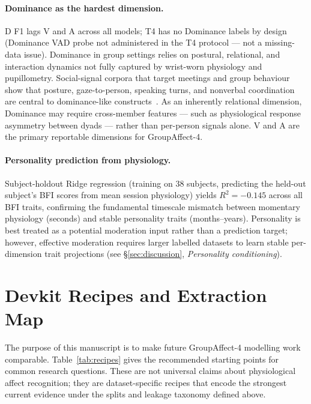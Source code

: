 \documentclass[sigconf,nonacm]{acmart}
\begin{document}
\paragraph{Dominance as the hardest dimension.}
D F1 lags V and A across all models; T4 has no Dominance labels by design
(Dominance VAD probe not administered in the T4 protocol --- not a missing-data
issue).
Dominance in group settings relies on postural, relational, and interaction
dynamics not fully captured by wrist-worn physiology and pupillometry.
Social-signal corpora that target meetings and group behaviour show that
posture, gaze-to-person, speaking turns, and nonverbal coordination are
central to dominance-like constructs~\cite{sanchez2012emergent,mccowan2005ami,
alameda2015salsa}.
As an inherently relational dimension, Dominance may
require cross-member features --- such as physiological response asymmetry
between dyads --- rather than per-person signals alone.
V and A are the primary reportable dimensions for GroupAffect-4.

\paragraph{Personality prediction from physiology.}
Subject-holdout Ridge regression (training on 38 subjects, predicting
the held-out subject's BFI scores from mean session physiology) yields
$R^2 = -0.145$ across all BFI traits, confirming the fundamental timescale
mismatch between momentary physiology (seconds) and stable personality
traits (months--years).
Personality is best treated as a potential moderation input rather than
a prediction target; however, effective moderation requires larger labelled
datasets to learn stable per-dimension trait projections
(see §\ref{sec:discussion}, \textit{Personality conditioning}).

\section{Devkit Recipes and Extraction Map}
\label{sec:devkit_recipes}

The purpose of this manuscript is to make future GroupAffect-4 modelling work
comparable.
Table~\ref{tab:recipes} gives the recommended starting points for common
research questions.
These are not universal claims about physiological affect recognition; they
are dataset-specific recipes that encode the strongest current evidence under
the splits and leakage taxonomy defined above.
\end{document}
